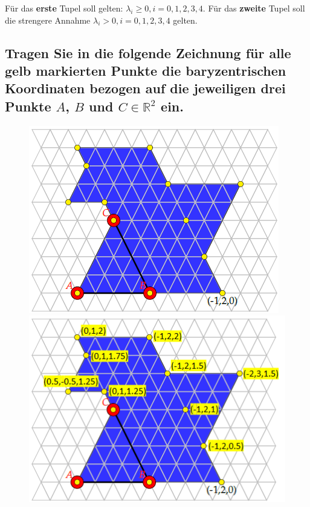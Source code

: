 \documentclass[a4paper,10pt,DIV=14]{scrartcl}
\begin{document}
Für das \textbf{erste} Tupel soll gelten: $\lambda_i \geq 0, i = 0,1,2,3,4$.
Für das \textbf{zweite} Tupel soll die strengere Annahme $\lambda_i > 0, i = 0,1,2,3,4$ gelten.


\subsection{Tragen Sie in die folgende Zeichnung für alle gelb markierten Punkte die baryzentrischen Koordinaten bezogen auf die jeweiligen drei Punkte $A$, $B$ und $C \in \mathbb{R}^2$ ein.}

\begin{figure}[!htbp]
	\begin{minipage}[c]{0.49\textwidth}
		\centering						
		\includegraphics[width=0.95\linewidth]{map}
	\end{minipage}
	\hfill
	\begin{minipage}[c]{0.49\textwidth}
		\centering						
		\includegraphics[width=0.95\linewidth]{map2}
	\end{minipage}
\end{figure}
\end{document}
